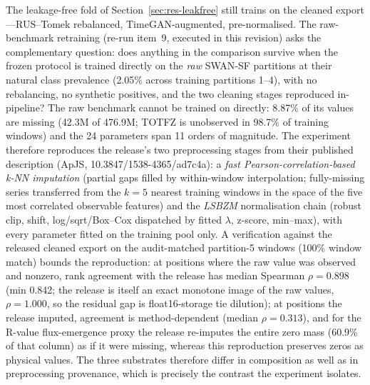 The leakage-free fold of Section~\ref{sec:res-leakfree} still trains
on the cleaned export---RUS--Tomek rebalanced, TimeGAN-augmented,
pre-normalised. The raw-benchmark retraining (re-run item~9,
executed in this revision) asks the complementary question: does anything in
the comparison survive when the frozen protocol is trained directly
on the \emph{raw} SWAN-SF partitions at their natural class
prevalence (2.05\% across training partitions 1--4), with no
rebalancing, no synthetic positives, and the two cleaning stages
reproduced in-pipeline? The raw benchmark cannot be trained on
directly: 8.87\% of its values are missing (42.3M of 476.9M; TOTFZ
is unobserved in 98.7\% of training windows) and the 24 parameters
span 11 orders of magnitude. The experiment therefore reproduces the
release's two preprocessing stages from their published description
(ApJS, 10.3847/1538-4365/ad7c4a): a \emph{fast
Pearson-correlation-based k-NN imputation} (partial gaps filled by
within-window interpolation; fully-missing series transferred from
the $k{=}5$ nearest training windows in the space of the five most
correlated observable features) and the \emph{LSBZM} normalisation
chain (robust clip, shift, log/sqrt/Box--Cox dispatched by fitted
$\lambda$, z-score, min--max), with every parameter fitted on the
training pool only. A verification against the released cleaned
export on the audit-matched partition-5 windows (100\% window match)
bounds the reproduction: at positions where the raw value was
observed and nonzero, rank agreement with the release has median
Spearman $\rho=0.898$ (min 0.842; the release is itself an exact
monotone image of the raw values, $\rho=1.000$, so the residual gap
is float16-storage tie dilution); at positions the release imputed,
agreement is method-dependent (median $\rho=0.313$), and for the
R-value flux-emergence proxy the release re-imputes the entire
zero mass (60.9\% of that column) as if it were missing, whereas
this reproduction preserves zeros as physical values. The three
substrates therefore differ in composition as well as in
preprocessing provenance, which is precisely the contrast the
experiment isolates.

